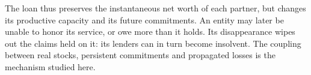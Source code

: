 The loan thus preserves the instantaneous net worth of each partner,
but changes its productive capacity and its future commitments. An
entity may later be unable to honor its service, or owe more than it
holds. Its disappearance wipes out the claims held on it: its lenders
can in turn become insolvent. The coupling between real stocks,
persistent commitments and propagated losses is the mechanism studied
here.
